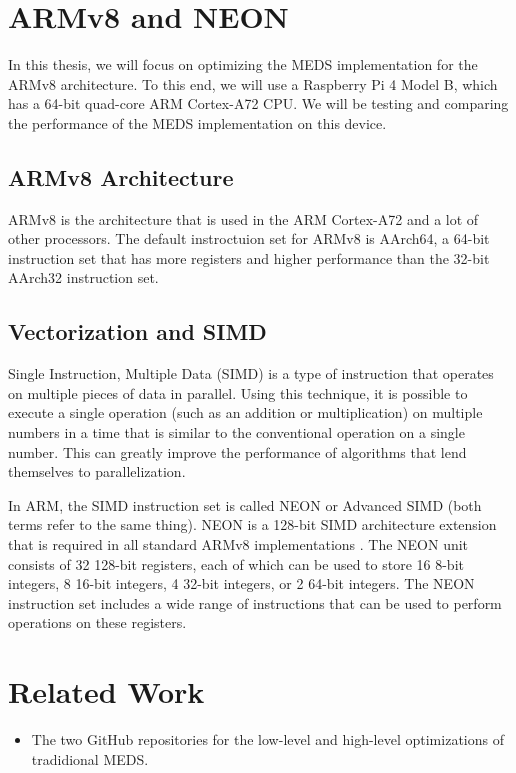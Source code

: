 \documentclass[11pt,a4paper]{report}
\begin{document}
\section{ARMv8 and NEON}
\label{sec:armv8}
In this thesis, we will focus on optimizing the MEDS implementation for the ARMv8 architecture. To this end, we will use a Raspberry Pi 4 Model B, which has a 64-bit quad-core ARM Cortex-A72 CPU. We will be testing and comparing the performance of the MEDS implementation on this device.

\subsection{ARMv8 Architecture}
ARMv8 is the architecture that is used in the ARM Cortex-A72 and a lot of other processors. The default instroctuion set for ARMv8 is AArch64, a 64-bit instruction set that has more registers and higher performance than the 32-bit AArch32 instruction set.

\subsection{Vectorization and SIMD}
Single Instruction, Multiple Data (SIMD) is a type of instruction that operates on multiple pieces of data in parallel. Using this technique, it is possible to execute a single operation (such as an addition or multiplication) on multiple numbers in a time that is similar to the conventional operation on a single number. This can greatly improve the performance of algorithms that lend themselves to parallelization.

In ARM, the SIMD instruction set is called NEON or Advanced SIMD (both terms refer to the same thing). NEON is a 128-bit SIMD architecture extension that is required in all standard ARMv8 implementations \cite{ARMv8A-ProgrammersGuide}. The NEON unit consists of 32 128-bit registers, each of which can be used to store 16 8-bit integers, 8 16-bit integers, 4 32-bit integers, or 2 64-bit integers. The NEON instruction set includes a wide range of instructions that can be used to perform operations on these registers.

\section{Related Work}
\begin{itemize}
  \item The two GitHub repositories for the low-level and high-level optimizations of tradidional MEDS.
\end{itemize}
\end{document}
